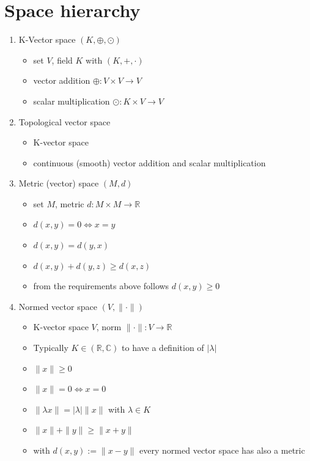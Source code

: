 \documentclass[10pt,a4paper]{book}
\theoremstyle{definition}
\begin{document}
\section{Space hierarchy}
\begin{enumerate}
    \item K-Vector space $(K,\oplus,\odot)$ 
        \begin{itemize}
            \item set $V$, field $K$ with $(K,+,\cdot)$
            \item vector addition $\oplus: V\times V\rightarrow V$
            \item scalar multiplication $\odot: K\times V\rightarrow V$
        \end{itemize}
    \item Topological vector space
        \begin{itemize}
            \item K-vector space
            \item continuous (smooth) vector addition and scalar multiplication
        \end{itemize}
    \item Metric (vector) space $(M,d)$
        \begin{itemize}
            \item set $M$, metric $d: M\times M\rightarrow \mathbb{R}$
            \item $d(x,y)=0 \Leftrightarrow x=y$
            \item $d(x,y)=d(y,x)$
            \item $d(x,y)+d(y,z) \ge d(x,z)$
            \item from the requirements above follows $d(x,y)\ge0$
        \end{itemize}
    \item Normed vector space $(V,\|\cdot\|)$
        \begin{itemize}
            \item K-vector space $V$, norm $\|\cdot\|: V\rightarrow \mathbb{R}$
            \item Typically $K\in(\mathbb{R}, \mathbb{C})$ to have a definition of $|\lambda|$
            \item $\|x\|\ge0$
            \item $\|x\|=0 \Leftrightarrow x=0$
            \item $\|\lambda x\|=|\lambda| \|x\|$ with $\lambda\in K$
            \item $\|x\|+\|y\|\ge\|x+y\|$
            \item with $d(x,y):=\|x-y\|$ every normed vector space has also a metric

\end{itemize}
\end{enumerate}
\end{document}
